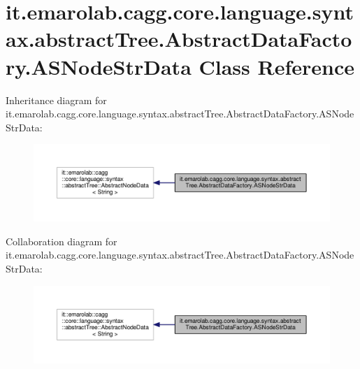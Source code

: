 \hypertarget{classit_1_1emarolab_1_1cagg_1_1core_1_1language_1_1syntax_1_1abstractTree_1_1AbstractDataFactory_1_1ASNodeStrData}{\section{it.\-emarolab.\-cagg.\-core.\-language.\-syntax.\-abstract\-Tree.\-Abstract\-Data\-Factory.\-A\-S\-Node\-Str\-Data Class Reference}
\label{classit_1_1emarolab_1_1cagg_1_1core_1_1language_1_1syntax_1_1abstractTree_1_1AbstractDataFactory_1_1ASNodeStrData}
}


Inheritance diagram for it.\-emarolab.\-cagg.\-core.\-language.\-syntax.\-abstract\-Tree.\-Abstract\-Data\-Factory.\-A\-S\-Node\-Str\-Data\-:\nopagebreak
\begin{figure}[H]
\begin{center}
\leavevmode
\includegraphics[width=350pt]{classit_1_1emarolab_1_1cagg_1_1core_1_1language_1_1syntax_1_1abstractTree_1_1AbstractDataFactory4e64ff06226c64d01f68ce8a8abd0ad2}
\end{center}
\end{figure}


Collaboration diagram for it.\-emarolab.\-cagg.\-core.\-language.\-syntax.\-abstract\-Tree.\-Abstract\-Data\-Factory.\-A\-S\-Node\-Str\-Data\-:\nopagebreak
\begin{figure}[H]
\begin{center}
\leavevmode
\includegraphics[width=350pt]{classit_1_1emarolab_1_1cagg_1_1core_1_1language_1_1syntax_1_1abstractTree_1_1AbstractDataFactory_1_1ASNodeStrData__coll__graph}
\end{center}
\end{figure}
